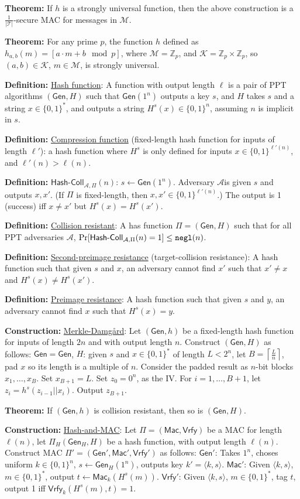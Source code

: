 \documentclass[10pt]{article}
\newcommand{\Z}{\mathbb{Z}}
\newcommand{\AAA}{\mathcal{A}}
\newcommand{\KKK}{\mathcal{K}}
\newcommand{\MMM}{\mathcal{M}}
\newcommand{\TTT}{\mathcal{T}}
\newcommand{\defn}[1]{{\bf Definition:} \underline{#1}}
\newcommand{\thm}[1]{{\bf Theorem:} \underline{#1}}
\newcommand{\con}[1]{{\bf Construction:} \underline{#1}}
\newcommand{\Mac}{\mathsf{Mac}}
\newcommand{\Vrfy}{\mathsf{Vrfy}}
\newcommand{\Gen}{\mathsf{Gen}}
\newcommand{\ang}[1]{\langle#1\rangle}
\newcommand{\ExptHCArgs}[2]{\mathsf{Hash\text{-}Coll}_{#1,#2}}
\newcommand{\ExptHC}{\ExptHCArgs{\AAA}{\Pi}}
\newcommand{\negl}{{\tt negl}}
\newcommand{\from}{\leftarrow}
\begin{document}
\begin{multicols}{5}
\thm{}If $h$ is a strongly universal function, then the above construction is a $\frac{1}{|\TTT|}$-secure MAC for messages in $\MMM$.

\thm{}For any prime $p$, the function $h$ defined as $h_{a,b}(m)=[a\cdot m+b\mod{p}]$, where $\MMM=\Z_p$, and $\KKK=\Z_p\times\Z_p$, so $(a,b)\in\KKK$, $m\in\MMM$, is strongly universal.

\defn{Hash function}: A function with output length $\ell$ is a pair of PPT algorithms $(\Gen, H)$ such that $\Gen(1^n)$ outputs a key $s$, and $H$ takes $s$ and a string $x\in\{0,1\}^*$, and outputs a string $H^s(x)\in\{0,1\}^n$, assuming $n$ is implicit in $s$.

\defn{Compression function} (fixed-length hash function for inputs of length $\ell'$): a hash function where $H^s$ is only defined for inputs $x\in\{0,1\}^{\ell'(n)}$, and $\ell'(n)>\ell(n)$.

\defn{$\ExptHC(n)$}: $s\from\Gen(1^n)$. Adversary $\AAA$is given $s$ and outputs $x,x'$. (If $\Pi$ is fixed-length, then $x,x'\in\{0,1\}^{\ell'(n)}$.) The output is 1 (success) iff $x\neq x'$ but $H^s(x)=H^s(x')$.

\defn{Collision resistant}: A has function $\Pi=(\Gen, H)$ such that for all PPT adversaries $\AAA$, $\Pr[\ExptHC(n)=1]\leq\negl(n)$.

\defn{Second-preimage resistance} (target-collision resistance): A hash function such that given $s$ and $x$, an adversary cannot find $x'$ such that $x'\neq x$ and $H^s(x)\neq H^s(x')$.

\defn{Preimage resistance}: A hash function such that given $s$ and $y$, an adversary cannot find $x$ such that $H^s(x)=y$.

\con{Merkle-Damg\r{a}rd}: Let $(\Gen, h)$ be a fixed-length hash function for inputs of length $2n$ and with output length $n$. Construct $(\Gen, H)$ as follows: $\Gen=\Gen$, $H$: given $s$ and $x\in\{0,1\}^*$ of length $L<2^n$, let $B=\left\lceil\frac{L}{n}\right\rceil$, pad $x$ so its length is a multiple of $n$. Consider the padded result as $n$-bit blocks $x_1, \dots,x_B$. Set $x_{B+1}=L$. Set $z_0=0^n$, as the IV. For $i=1,\dots,B+1$, let $z_i=h^s(z_{i-1}||x_i)$. Output $z_{B+1}$.

\thm{}If $(\Gen, h)$ is collision resistant, then so is $(\Gen, H)$.

\con{Hash-and-MAC}: Let $\Pi=(\Mac,\Vrfy)$ be a MAC for length $\ell(n)$, let $\Pi_{H}(\Gen_H,H)$ be a hash function, with output length $\ell(n)$. Construct MAC $\Pi'=(\Gen',\Mac',\Vrfy')$ as follows: $\Gen'$: Takes $1^n$, choses uniform $k\in\{0,1\}^n$, $s\from\Gen_H(1^n)$, outputs key $k'=\ang{k,s}$. $\Mac'$: Given $\ang{k,s}$, $m\in\{0,1\}^*$, output $t\from\Mac_k(H^s(m))$. $\Vrfy'$: Given $\ang{k,s}$, $m\in\{0,1\}^*$, tag $t$, output 1 iff $\Vrfy_k(H^s(m),t)=1$.


\end{multicols}
\end{document}
